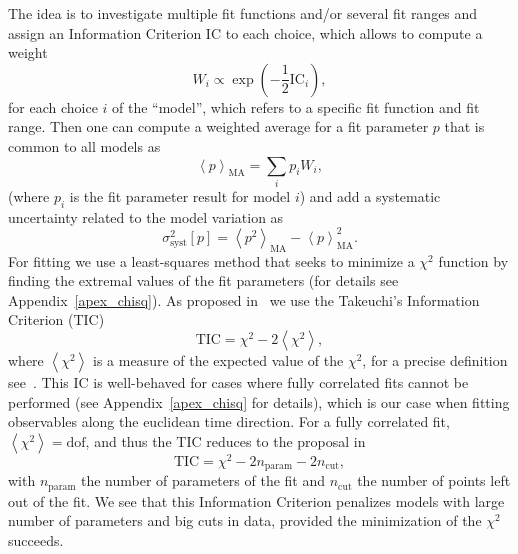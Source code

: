 The idea is to investigate multiple fit functions and/or several fit ranges and assign an Information Criterion ${\textrm{IC}}$ to each choice, which allows to compute a weight
\begin{equation}
\label{ch_observables:eq:weight}
W_i\propto\exp\left(-\frac{1}{2}{\textrm{IC}}_i\right),
\end{equation}
for each choice $i$ of the ``model'', which refers to a specific fit function and fit range. Then one can compute a weighted average for a fit parameter $p$ that is common to all models as
\begin{equation}
\left<{p}\right>_{\textrm{MA}}=\sum_i{p}_iW_i,
\end{equation}
(where $p_i$ is the fit parameter result for model $i$) and add a systematic uncertainty related to the model variation as
\begin{equation}
\label{ch_observables:eq:syst}
\sigma_{\textrm{syst}}^2[p]=\left<{p^2}\right>_{\textrm{MA}}-\left<p\right>^2_{\textrm{MA}}.
\end{equation}
For fitting we use a least-squares method that seeks to minimize a $\chi^2$ function by finding the extremal values of the fit parameters (for details see Appendix~\ref{apex_chisq}). As proposed in~\citep{Frison:2023jbv} we use the Takeuchi's Information Criterion (TIC)
\begin{equation}
{\textrm{TIC}}=\chi^2-2\left<\chi^2\right>,
\end{equation}
where $\left<\chi^2\right>$ is a measure of the expected value of the $\chi^2$, for a precise definition see~\citep{Bruno:2022mfy}. This IC is well-behaved for cases where fully correlated fits cannot be performed (see Appendix~\ref{apex_chisq} for details), which is our case when fitting observables along the euclidean time direction. For a fully correlated fit, $\left<\chi^2\right>={\textrm{dof}}$, and thus the TIC reduces to the proposal in~\citep{Neil:2022joj}
\begin{equation}
{\textrm{TIC}}=\chi^2-2n_{\textrm{param}}-2n_{\textrm{cut}},
\end{equation}
with $n_{\textrm{param}}$ the number of parameters of the fit and $n_{\textrm{cut}}$ the number of points left out of the fit. We see that this Information Criterion penalizes models with large number of parameters and big cuts in data, provided the minimization of the $\chi^2$ succeeds.

